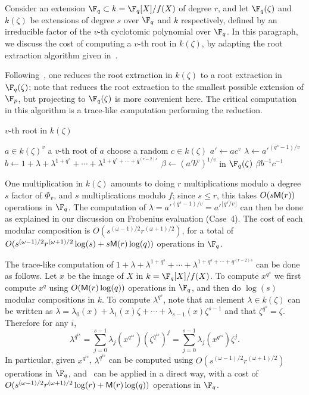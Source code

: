 Consider an extension $\F_q \subset k=\F_q[X]/f(X)$ of degree $r$, and
let $\F_q(\zeta)$ and $k(\zeta)$ be extensions of degree $s$ over
$\F_q$ and $k$ respectively, defined by an irreducible factor of the
$v$-th cyclotomic polynomial over $\F_q$. In this paragraph, we
discuss the cost of computing a $v$-th root in $k(\zeta)$, by adapting
the root extraction algorithm given in~\cite{doliskanischost2011}.

Following~\cite[Algorithm~3]{doliskanischost2011}, one reduces the
root extraction in $k(\zeta)$ to a root extraction in $\F_q(\zeta)$;
note that \cite[Algorithm~3]{doliskanischost2011} reduces the root
extraction to the smallest possible extension of $\F_p$, but
projecting to $\F_q(\zeta)$ is more convenient here. The critical
computation in this algorithm is a trace-like computation performing
the reduction.

\begin{algorithm}
\caption{$v$-th root in $k(\zeta)$}
\label{algorithm:new}
\begin{algorithmic}[1]
\REQUIRE $a \in k(\zeta)^v$
\ENSURE a $v$-th root of $a$
\REPEAT
\STATE choose a random $c \in k(\zeta)$
\STATE $a'\leftarrow ac^v$
\STATE $\lambda \leftarrow {a'}^{(q^s-1)/v}$
\STATE $b \leftarrow 1 + \lambda + \lambda^{1+q^{s}} + \cdots + \lambda^{1+q^{s}+\cdots+q^{(r-2)s}}$
\STATE $\beta \leftarrow (a'b^v)^{1/v}$ in $\F_q(\zeta)$
\RETURN $\beta b^{-1}c^{-1}$
\end{algorithmic}
\end{algorithm}

One multiplication in $k(\zeta)$ amounts to doing $r$ multiplications
modulo a degree $s$ factor of $\Phi_v$, and $s$ multiplications modulo
$f$; since $s \le r$, this takes $O(s \mathsf{M}(r))$ operations in $\F_q$.
The computation of $\lambda = {a'}^{(q^s - 1)/v}= {a'}^{\lfloor
  q^s/v\rfloor}$ can then be done as explained in our discussion on
Frobenius evaluation (Case~4). The cost of each modular composition
 is $O(s^{(\omega-1)/2} r^{(\omega+1)/2})$, for a 
total of $O(s^{(\omega-1)/2} r^{(\omega+1)/2}\log(s) +
s\mathsf{M}(r)\log(q))$ operations in $\F_q$.


The trace-like computation of $1 + \lambda + \lambda^{1+q^{s}} +
\cdots + \lambda^{1+q^{s}+\cdots+q^{(r-2)s}}$ can be done as follows.
Let $x$ be the image of $X$ in $k=\F_q[X]/f(X)$.  To compute $x^{q^s}$
we first compute $x^q$ using $O(\mathsf{M}(r)\log(q))$ operations in $\F_q$,
and then do $\log(s)$ modular compositions in $k$.  To compute
$\lambda^{q^s}$, note that an element $\lambda \in k(\zeta)$ can be
written as $\lambda = \lambda_0(x) + \lambda_1(x) \zeta + \cdots +
\lambda_{s - 1}(x) \zeta^{s - 1}$ and that $\zeta^{q^s} = \zeta$.
Therefore for any $i$,
\[
\lambda^{q^{i s}} = \sum_{j = 0}^{s - 1} \lambda_j(x^{q^{i s}}) \left(\zeta^{q^{i s}}\right)^j = \sum_{j = 0}^{s - 1} \lambda_j(x^{q^{i s}}) \zeta^j.
\]
In particular, given $x^{q^{i s}}$, $\lambda^{q^{is}}$ can be computed using $O(s^{(\omega-1)/2}r^{(\omega+1)/2})$ operations in $\F_q$,
and~\cite[Algorithm~2]{doliskanischost2011} can be applied in a direct
way, with a cost of $O(s^{(\omega-1)/2}r^{(\omega+1)/2}\log(r) + \mathsf{M}(r)\log(q))$ operations in $\F_q$.

